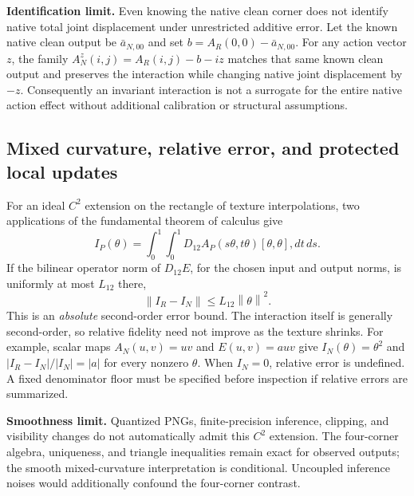 \documentclass[10pt,a4paper]{article}
\newcommand{\norm}[1]{\left\|#1\right\|}
\begin{document}
\textbf{Identification limit.} Even knowing the native clean corner does not
identify native total joint displacement under unrestricted additive error.
Let the known native clean output be $\bar a_{N,00}$ and set
$b=A_R(0,0)-\bar a_{N,00}$. For any action vector $z$, the family
$A_N^z(i,j)=A_R(i,j)-b-iz$ matches that same known clean output and preserves
the interaction while changing native joint displacement by $-z$.
Consequently an invariant interaction is not a surrogate for the entire native
action effect without additional calibration or structural assumptions.

\newpage
\subsection*{Mixed curvature, relative error, and protected local updates}
For an ideal $C^2$ extension on the rectangle of texture interpolations, two
applications of the fundamental theorem of calculus give
\begin{equation}\label{eq:mixed}
 I_P(\theta)=\int_0^1\!\int_0^1
 D_{12}A_P(s\theta,t\theta)[\theta,\theta],dt\,ds.
\end{equation}
If the bilinear operator norm of $D_{12}E$, for the chosen input and output
norms, is uniformly at most $L_{12}$ there,
\begin{equation}\label{eq:mixederror}
 \norm{I_R-I_N}\leq L_{12}\norm{\theta}^2.
\end{equation}
This is an \emph{absolute} second-order error bound. The interaction itself is
generally second-order, so relative fidelity need not improve as the texture
shrinks. For example, scalar maps $A_N(u,v)=uv$ and
$E(u,v)=a uv$ give $I_N(\theta)=\theta^2$ and
$|I_R-I_N|/|I_N|=|a|$ for every nonzero $\theta$.
When $I_N=0$, relative error is undefined. A fixed denominator floor must be
specified before inspection if relative errors are summarized.

\textbf{Smoothness limit.} Quantized PNGs, finite-precision inference, clipping,
and visibility changes do not automatically admit this $C^2$ extension.
The four-corner algebra, uniqueness, and triangle inequalities remain exact
for observed outputs; the smooth mixed-curvature interpretation is conditional.
Uncoupled inference noises would additionally confound the four-corner contrast.
\end{document}
